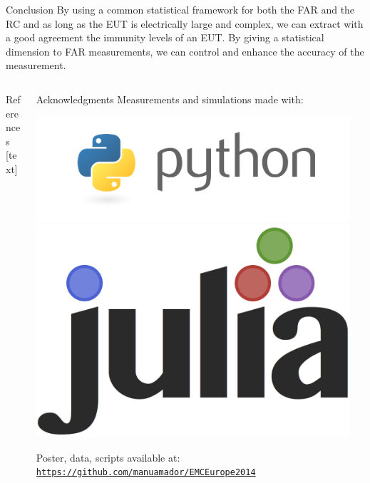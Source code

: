 \documentclass[final,hyperref={pdfpagelabels=false}]{beamer}
\begin{document}
\begin{frame}{}
\begin{block}{\Huge{Conclusion}} \justifying
\Large{By using a common statistical framework for both the FAR and the RC and as long as the EUT is electrically large and complex, we can extract with a good agreement the immunity levels of an EUT. By giving a statistical dimension to FAR measurements, we can control and enhance the accuracy of the measurement.}
	\end{block}%


\begin{columns}

 \begin{column}{0.71\linewidth}
\vspace{-0.3cm}   
\begin{block}{References} \justifying
{}[text]

 \small

	\end{block}

    \end{column}%

    \begin{column}{0.2\linewidth}
    \vspace{-0.4cm}
  \begin{block}{Acknowledgments}
    \vspace{-0.5cm}
Measurements and simulations made with:\\\centerline{\includegraphics[trim=150 120 120 60,clip,width=.3\columnwidth]{./img/python_logo.png}
\hspace{1cm} \includegraphics[width=.15\columnwidth]{./img/julia.png}}
Poster, data, scripts available at:\\\href{https://github.com/manuamador/EMCEurope2014}{\small{\texttt{https://github.com/manuamador/EMCEurope2014}}}
      \end{block}
\end{column}%
\begin{column}{0.07\linewidth}


\end{column}
\end{columns}
\end{frame}
\end{document}
